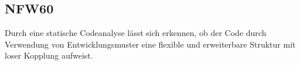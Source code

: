 \subsection*{NFW60}

Durch eine statische Codeanalyse lässt sich erkennen, ob der Code durch Verwendung von Entwicklungsmuster eine flexible und erweiterbare Struktur mit loser Kopplung aufweist.
